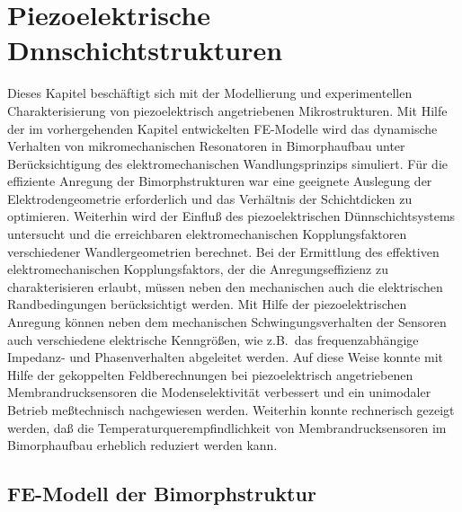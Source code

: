 \chapter{Piezoelektrische Dnnschichtstrukturen}
\label{piezoelektrisch}

Dieses Kapitel beschäftigt sich mit der Modellierung und experimentellen
Charakterisierung von piezoelektrisch angetriebenen Mikrostrukturen.
Mit Hilfe der im vorhergehenden Kapitel entwickelten FE-Modelle wird
das dynamische Verhalten von mikromechanischen Resonatoren in Bimorphaufbau
unter Berücksichtigung des elektromechanischen Wandlungsprinzips simuliert.
Für die effiziente Anregung der Bimorphstrukturen war eine geeignete
Auslegung der Elektrodengeometrie erforderlich und das Verhältnis der
Schichtdicken zu optimieren. Weiterhin wird der Einfluß des piezoelektrischen
Dünnschichtsystems untersucht und die erreichbaren elektromechanischen
Kopplungsfaktoren verschiedener Wand\-lergeometrien berechnet.
Bei der Ermittlung des effektiven elektromechanischen Kopplungsfaktors, der
die Anregungseffizienz zu charakterisieren erlaubt, müssen neben den
mechanischen auch die elektrischen Randbedingungen berücksichtigt werden.
Mit Hilfe der piezoelektrischen Anregung können neben dem mechanischen
Schwingungsverhalten der Sensoren auch verschiedene elektrische
Kenngrößen, wie z.B.\ das frequenzabhängige Impedanz- und Phasenverhalten
abgeleitet werden. Auf diese Weise konnte mit Hilfe der
gekoppelten Feldberechnungen bei piezoelektrisch angetriebenen
Membrandrucksensoren die Modenselektivität verbessert und ein unimodaler
Betrieb meßtechnisch nachgewiesen werden. Weiterhin konnte rechnerisch
gezeigt werden, daß die Temperaturquerempfindlichkeit von
Membrandrucksensoren im Bimorphaufbau erheblich reduziert werden kann.


\section{FE-Modell der Bimorphstruktur}
\label{bimorphstruktur}

